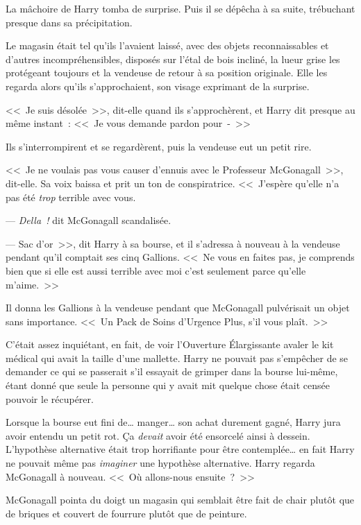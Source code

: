 La mâchoire de Harry tomba de surprise. Puis il se dépêcha à sa suite, trébuchant presque dans sa précipitation.

\later

Le magasin était tel qu'ils l'avaient laissé, avec des objets reconnaissables et d'autres incompréhensibles, disposés sur l'étal de bois incliné, la lueur grise les protégeant toujours et la vendeuse de retour à sa position originale. Elle les regarda alors qu'ils s'approchaient, son visage exprimant de la surprise.

<<~Je suis désolée~>>, dit-elle quand ils s'approchèrent, et Harry dit presque au même instant~: <<~Je vous demande pardon pour~-~>>

Ils s'interrompirent et se regardèrent, puis la vendeuse eut un petit rire. 

<<~Je ne voulais pas vous causer d'ennuis avec le Professeur McGonagall~>>, dit-elle. Sa voix baissa et prit un ton de conspiratrice. <<~J'espère qu'elle n'a pas été \emph{trop} terrible avec vous.

--- \emph{Della~!} dit McGonagall scandalisée.

--- Sac d'or~>>, dit Harry à sa bourse, et il s'adressa à nouveau à la vendeuse pendant qu'il comptait ses cinq Gallions. <<~Ne vous en faites pas, je comprends bien que si elle est aussi terrible avec moi c'est seulement parce qu'elle m'aime.~>>

Il donna les Gallions à la vendeuse pendant que McGonagall pulvérisait un objet sans importance. <<~Un Pack de Soins d'Urgence Plus, s'il vous plaît.~>>

C'était assez inquiétant, en fait, de voir l'Ouverture Élargissante avaler le kit médical qui avait la taille d'une mallette. Harry ne pouvait pas s'empêcher de se demander ce qui se passerait s'il essayait de grimper dans la bourse lui-même, étant donné que seule la personne qui y avait mit quelque chose était censée pouvoir le récupérer.

Lorsque la bourse eut fini de… manger… son achat durement gagné, Harry jura avoir entendu un petit rot. Ça \emph{devait} avoir été ensorcelé ainsi à dessein. L'hypothèse alternative était trop horrifiante pour être contemplée… en fait Harry ne pouvait même pas \emph{imaginer} une hypothèse alternative. Harry regarda McGonagall à nouveau. <<~Où allons-nous ensuite~?~>>

McGonagall pointa du doigt un magasin qui semblait être fait de chair plutôt que de briques et couvert de fourrure plutôt que de peinture. 

